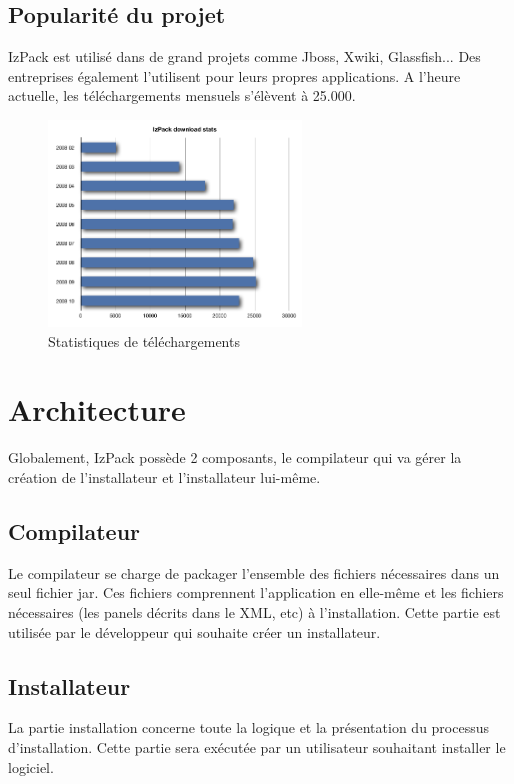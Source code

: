 \subsection{Popularité du projet}
IzPack est utilisé dans de grand projets comme Jboss, Xwiki, Glassfish... Des entreprises également l'utilisent pour leurs propres applications. A l'heure actuelle, les téléchargements mensuels s'élèvent à 25.000.
\begin{figure}[H]
	\centering
	\includegraphics[width=0.6\textwidth]{../image/telechargements.png}
	\caption{Statistiques de téléchargements}
\end{figure}
\section{Architecture}
Globalement, IzPack possède 2 composants, le compilateur qui va gérer la création de l'installateur et l'installateur lui-même.

\subsection{Compilateur}
Le compilateur se charge de packager l'ensemble des fichiers nécessaires dans un seul fichier jar.
Ces fichiers comprennent l'application en elle-même et les fichiers nécessaires (les panels décrits dans le XML, etc) à l'installation.
Cette partie est utilisée par le développeur qui souhaite créer un installateur.

\subsection{Installateur}
La partie installation concerne toute la logique et la présentation du processus d'installation. Cette partie sera exécutée par un utilisateur souhaitant installer le logiciel.
